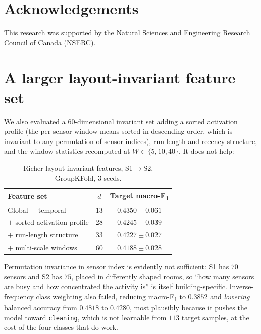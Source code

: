 \documentclass[a4paper,fleqn]{cas-dc}
\newcommand{\macf}{macro-F\textsubscript{1}}
\begin{document}
\section*{Acknowledgements}

This research was supported by the Natural Sciences and Engineering Research Council of
Canada (NSERC).

\appendix
\section{A larger layout-invariant feature set}
\label{app:inv}

We also evaluated a $60$-dimensional invariant set adding a sorted activation profile (the
per-sensor window means sorted in descending order, which is invariant to any permutation
of sensor indices), run-length and recency structure, and the window statistics recomputed
at $W\in\{5,10,40\}$. It does not help:

\begin{table}[t]
\centering
\caption{Richer layout-invariant features, S1$\to$S2, GroupKFold, 3 seeds.}
\begin{tabular}{lcc}
\toprule
Feature set & $d$ & Target \macf \\
\midrule
Global $+$ temporal                      & 13 & $\mathbf{0.4350}\pm0.061$ \\
$+$ sorted activation profile            & 28 & $0.4245\pm0.039$ \\
$+$ run-length structure                 & 33 & $0.4227\pm0.027$ \\
$+$ multi-scale windows                  & 60 & $0.4188\pm0.028$ \\
\bottomrule
\end{tabular}
\end{table}

Permutation invariance in sensor index is evidently not sufficient: S1 has $70$ sensors and
S2 has $75$, placed in differently shaped rooms, so ``how many sensors are busy and how
concentrated the activity is'' is itself building-specific. Inverse-frequency class
weighting also failed, reducing \macf{} to $0.3852$ and \emph{lowering} balanced accuracy
from $0.4818$ to $0.4280$, most plausibly because it pushes the model toward
\texttt{cleaning}, which is not learnable from $113$ target samples, at the cost of the
four classes that do work.
\end{document}
